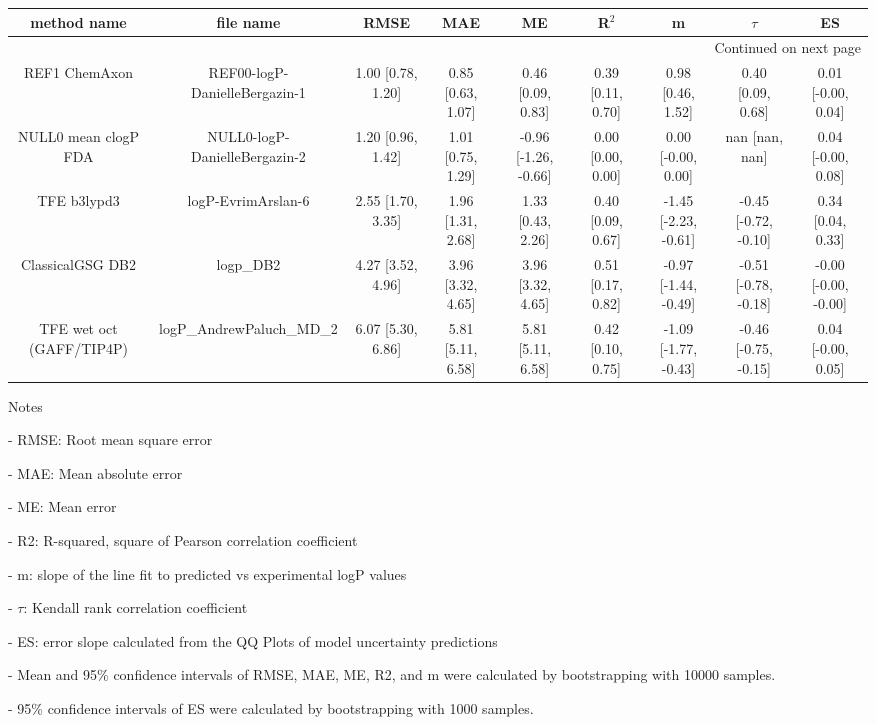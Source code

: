 \documentclass{article}
\begin{document}
\begin{center}
\scriptsize
\begin{longtable}{|ccccccccc|}
\toprule
              method name &                      file name &               RMSE &                MAE &                    ME &              R$^2$ &                     m &                $\tau$ &                    ES \\
\midrule
\endhead
\midrule
\multicolumn{9}{r}{{Continued on next page}} \\
\midrule
\endfoot

\bottomrule
\endlastfoot
            REF1 ChemAxon &  REF00-logP-DanielleBergazin-1 &  1.00 [0.78, 1.20] &  0.85 [0.63, 1.07] &     0.46 [0.09, 0.83] &  0.39 [0.11, 0.70] &     0.98 [0.46, 1.52] &     0.40 [0.09, 0.68] &    0.01 [-0.00, 0.04] \\
     NULL0 mean clogP FDA &  NULL0-logP-DanielleBergazin-2 &  1.20 [0.96, 1.42] &  1.01 [0.75, 1.29] &  -0.96 [-1.26, -0.66] &  0.00 [0.00, 0.00] &    0.00 [-0.00, 0.00] &        nan [nan, nan] &    0.04 [-0.00, 0.08] \\
              TFE b3lypd3 &             logP-EvrimArslan-6 &  2.55 [1.70, 3.35] &  1.96 [1.31, 2.68] &     1.33 [0.43, 2.26] &  0.40 [0.09, 0.67] &  -1.45 [-2.23, -0.61] &  -0.45 [-0.72, -0.10] &     0.34 [0.04, 0.33] \\
         ClassicalGSG DB2 &                      logp\_DB2 &  4.27 [3.52, 4.96] &  3.96 [3.32, 4.65] &     3.96 [3.32, 4.65] &  0.51 [0.17, 0.82] &  -0.97 [-1.44, -0.49] &  -0.51 [-0.78, -0.18] &  -0.00 [-0.00, -0.00] \\
 TFE wet oct (GAFF/TIP4P) &      logP\_AndrewPaluch\_MD\_2 &  6.07 [5.30, 6.86] &  5.81 [5.11, 6.58] &     5.81 [5.11, 6.58] &  0.42 [0.10, 0.75] &  -1.09 [-1.77, -0.43] &  -0.46 [-0.75, -0.15] &    0.04 [-0.00, 0.05] \\
\end{longtable}
\end{center}

Notes

- RMSE: Root mean square error

- MAE: Mean absolute error

- ME: Mean error

- R2: R-squared, square of Pearson correlation coefficient

- m: slope of the line fit to predicted vs experimental logP values

- $\tau$:  Kendall rank correlation coefficient

- ES: error slope calculated from the QQ Plots of model uncertainty predictions

- Mean and 95\% confidence intervals of RMSE, MAE, ME, R2, and m were calculated by bootstrapping with 10000 samples.

- 95\% confidence intervals of ES were calculated by bootstrapping with 1000 samples.\end{document}
\end{document}
